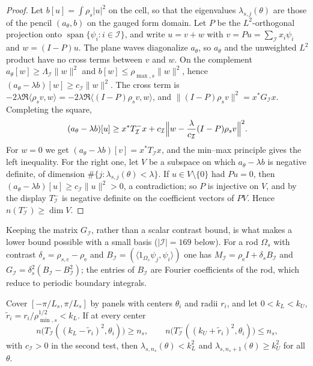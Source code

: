 \begin{proof}
Let $b[u]=\int\rho_s|u|^2$ on the cell, so that the eigenvalues
$\lambda_{s,j}(\theta)$ are those of the pencil $(a_\theta,b)$ on the gauged form
domain. Let $P$ be the $L^2$-orthogonal projection onto
$\operatorname{span}\{\psi_i:i\in\mathcal I\}$, and write $u=v+w$ with
$v=Pu=\sum_{\mathcal I}x_i\psi_i$ and $w=(I-P)u$. The plane waves diagonalize
$a_\theta$, so $a_\theta$ and the unweighted $L^2$ product have no cross terms
between $v$ and $w$. On the complement $a_\theta[w]\ge\Lambda_{\mathcal I}\|w\|^2$
and $b[w]\le\rho_{\max,s}\|w\|^2$, hence $(a_\theta-\lambda b)[w]\ge
c_{\mathcal I}\|w\|^2$. The cross term is
$-2\lambda\Re\langle\rho_sv,w\rangle=-2\lambda\Re\langle(I-P)\rho_sv,w\rangle$, and
$\|(I-P)\rho_sv\|^2=x^*G_{\mathcal I}x$. Completing the square,
\[
  (a_\theta-\lambda b)[u]\ge x^*T^-_{\mathcal I}x
  +c_{\mathcal I}\Bigl\|w-\frac{\lambda}{c_{\mathcal I}}(I-P)\rho_sv\Bigr\|^2 .
\]
For $w=0$ we get $(a_\theta-\lambda b)[v]=x^*T_{\mathcal I}x$, and the min--max
principle gives the left inequality. For the right one, let $V$ be a subspace on
which $a_\theta-\lambda b$ is negative definite, of dimension
$\#\{j:\lambda_{s,j}(\theta)<\lambda\}$. If $u\in V\setminus\{0\}$ had $Pu=0$, then
$(a_\theta-\lambda b)[u]\ge c_{\mathcal I}\|u\|^2>0$, a contradiction; so $P$ is
injective on $V$, and by the display $T^-_{\mathcal I}$ is negative definite on
the coefficient vectors of $PV$. Hence $n(T^-_{\mathcal I})\ge\dim V$.
\end{proof}

Keeping the matrix $G_{\mathcal I}$, rather than a
scalar contrast bound, is what makes a lower bound possible with a small basis
($|\mathcal I|=169$ below). For a rod $\Omega_s$ with contrast
$\delta_s=\rho_{s,\mathrm c}-\rho_{\mathrm e}$ and
$B_{\mathcal I}=(\langle1_{\Omega_s}\psi_j,\psi_i\rangle)$ one has
$M_{\mathcal I}=\rho_{\mathrm e}I+\delta_sB_{\mathcal I}$ and
$G_{\mathcal I}=\delta_s^2(B_{\mathcal I}-B_{\mathcal I}^2)$; the entries of
$B_{\mathcal I}$ are Fourier coefficients of the rod, which reduce to periodic
boundary integrals.

\begin{proposition}\label{prop:panel}
Cover $[-\pi/L_s,\pi/L_s]$ by panels with centers $\theta_i$ and radii $r_i$,
and let $0<k_L<k_U$, $\tilde r_i=r_i/\rho_{\min,s}^{1/2}<k_L$. If at every center
\begin{equation}\label{eq:panel-tests}
  n\bigl(T_{\mathcal I}((k_L-\tilde r_i)^2,\theta_i)\bigr)\ge n_s,\qquad
  n\bigl(T^-_{\mathcal I}((k_U+\tilde r_i)^2,\theta_i)\bigr)\le n_s,
\end{equation}
with $c_{\mathcal I}>0$ in the second test, then $\lambda_{s,n_s}(\theta)<k_L^2$
and $\lambda_{s,n_s+1}(\theta)\ge k_U^2$ for all $\theta$.
\end{proposition}

